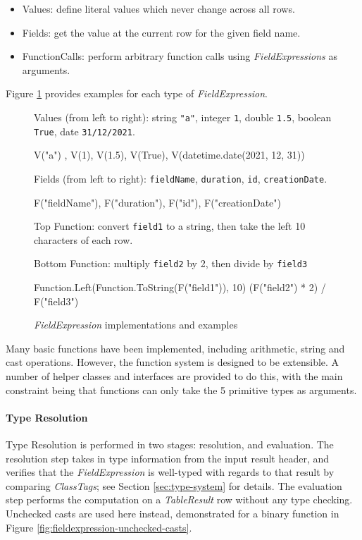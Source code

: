 \begin{itemize}
	\item Values: define literal values which never change across all rows.
	\item Fields: get the value at the current row for the given field name.
	\item FunctionCalls: perform arbitrary function calls using \textit{FieldExpressions} as arguments.
\end{itemize}

Figure \ref{fig:field-expressions-examples} provides examples for each type of \textit{FieldExpression}.

\begin{figure}[htp]
	Values (from left to right): string \texttt{"a"}, integer \texttt{1}, double \texttt{1.5}, boolean \texttt{True}, date \texttt{31/12/2021}.
	\begin{python}
V("a") , V(1), V(1.5), V(True), V(datetime.date(2021, 12, 31))
	\end{python}

	Fields (from left to right): \texttt{fieldName}, \texttt{duration}, \texttt{id}, \texttt{creationDate}.
	\begin{python}
F("fieldName"), F("duration"), F("id"), F("creationDate")
	\end{python}

	Top Function: convert \texttt{field1} to a string, then take the left 10 characters of each row.
	
	Bottom Function: multiply \texttt{field2} by 2, then divide by \texttt{field3}
	\begin{python}
Function.Left(Function.ToString(F("field1")), 10)
(F("field2") * 2) / F("field3")
	\end{python}
	\caption{\textit{FieldExpression} implementations and examples}
	\label{fig:field-expressions-examples}
\end{figure}

Many basic functions have been implemented, including arithmetic, string and cast operations. However, the function system is designed to be extensible. A number of helper classes and interfaces are provided to do this, with the main constraint being that functions can only take the 5 primitive types as arguments.

\paragraph{Type Resolution} 
Type Resolution is performed in two stages: resolution, and evaluation. The resolution step takes in type information from the input result header, and verifies that the \textit{FieldExpression} is well-typed with regards to that result by comparing \textit{ClassTags}; see Section \ref{sec:type-system} for details. The evaluation step performs the computation on a \textit{TableResult} row without any type checking. Unchecked casts are used here instead, demonstrated for a binary function in Figure \ref{fig:fieldexpression-unchecked-casts}. 

